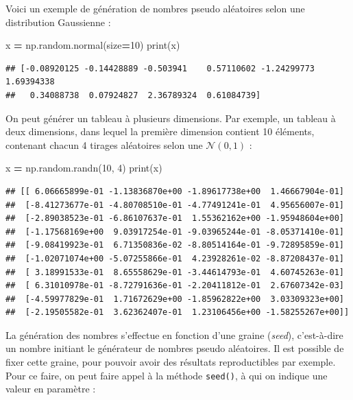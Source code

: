 \documentclass[12pt,]{book}
\newenvironment{Shaded}{\begin{snugshade}}{\end{snugshade}}
\newcommand{\DecValTok}[1]{\textcolor[rgb]{0.00,0.00,0.81}{#1}}
\newcommand{\OperatorTok}[1]{\textcolor[rgb]{0.81,0.36,0.00}{\textbf{#1}}}
\newcommand{\BuiltInTok}[1]{#1}
\newcommand{\NormalTok}[1]{#1}
\numberwithin{equation}{section}
\numberwithin{countremarque}{section}
\begin{document}
Voici un exemple de génération de nombres pseudo aléatoires selon une
distribution Gaussienne :

\begin{Shaded}
\begin{Highlighting}[]
\NormalTok{x }\OperatorTok{=}\NormalTok{ np.random.normal(size}\OperatorTok{=}\DecValTok{10}\NormalTok{)}
\BuiltInTok{print}\NormalTok{(x)}
\end{Highlighting}
\end{Shaded}

\begin{lstlisting}
## [-0.08920125 -0.14428889 -0.503941    0.57110602 -1.24299773  1.69394338
##   0.34088738  0.07924827  2.36789324  0.61084739]
\end{lstlisting}

On peut générer un tableau à plusieurs dimensions. Par exemple, un
tableau à deux dimensions, dans lequel la première dimension contient 10
éléments, contenant chacun 4 tirages aléatoires selon une
\(\mathcal{N}(0,1)\) :

\begin{Shaded}
\begin{Highlighting}[]
\NormalTok{x }\OperatorTok{=}\NormalTok{ np.random.randn(}\DecValTok{10}\NormalTok{, }\DecValTok{4}\NormalTok{)}
\BuiltInTok{print}\NormalTok{(x)}
\end{Highlighting}
\end{Shaded}

\begin{lstlisting}
## [[ 6.06665899e-01 -1.13836870e+00 -1.89617738e+00  1.46667904e-01]
##  [-8.41273677e-01 -4.80708510e-01 -4.77491241e-01  4.95656007e-01]
##  [-2.89038523e-01 -6.86107637e-01  1.55362162e+00 -1.95948604e+00]
##  [-1.17568169e+00  9.03917254e-01 -9.03965244e-01 -8.05371410e-01]
##  [-9.08419923e-01  6.71350836e-02 -8.80514164e-01 -9.72895859e-01]
##  [-1.02071074e+00 -5.07255866e-01  4.23928261e-02 -8.87208437e-01]
##  [ 3.18991533e-01  8.65558629e-01 -3.44614793e-01  4.60745263e-01]
##  [ 6.31010978e-01 -8.72791636e-01 -2.20411812e-01  2.67607342e-03]
##  [-4.59977829e-01  1.71672629e+00 -1.85962822e+00  3.03309323e+00]
##  [-2.19505582e-01  3.62362407e-01  1.23106456e+00 -1.58255267e+00]]
\end{lstlisting}

La génération des nombres s'effectue en fonction d'une graine
(\emph{seed}), c'est-à-dire un nombre initiant le générateur de nombres
pseudo aléatoires. Il est possible de fixer cette graine, pour pouvoir
avoir des résultats reproductibles par exemple. Pour ce faire, on peut
faire appel à la méthode \texttt{seed()}, à qui on indique une valeur en
paramètre :
\end{document}
